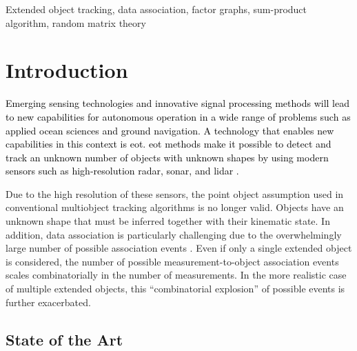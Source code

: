 \documentclass[10pt, twoside, romanappendices]{IEEEtran}
\providecommand{\rd}{\textcolor{black}}
\begin{document}
\begin{IEEEkeywords}
Extended object tracking, data association, factor graphs, sum-product algorithm, random matrix theory
\end{IEEEkeywords}


\section{Introduction }
\label{sec:introduction}

\rd{Emerging sensing technologies and innovative signal processing methods will lead to new capabilities for autonomous operation in a wide range of problems such as applied ocean sciences and ground navigation. A technology that enables new capabilities in this context is \ac{eot}. \ac{eot} methods make it possible to detect and track an unknown number of objects with unknown shapes by using modern sensors such as high-resolution radar, sonar, and lidar \cite{GraBauReu:J17}.}

Due to the high resolution of these sensors, the point object assumption used in conventional multiobject tracking algorithms \cite{BarWilTia:B11,Mah:B07,MeyKroWilLauHlaBraWin:J18} is no longer valid. Objects have an unknown shape that must be inferred together with their kinematic state. In addition, data association is particularly challenging due to the overwhelmingly large number of possible association events \cite{GraFatSve:J19}. Even if only a single extended object is considered, the number of possible measurement-to-object association events scales combinatorially in the number of measurements. In the more realistic case of multiple extended objects, this ``combinatorial explosion'' of possible events is further exacerbated.

\subsection{State of the Art }
\label{sec:SoA}
 
\end{document}
